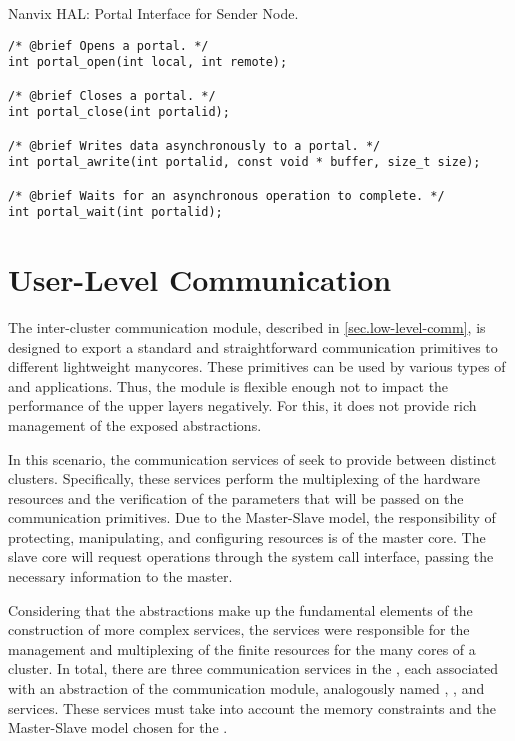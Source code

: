 \begin{listing}[!tb]
\caption{Nanvix HAL: Portal Interface for Sender Node.}
\label{code:hal-portal-sender}
\begin{verbatim}
/* @brief Opens a portal. */
int portal_open(int local, int remote);

/* @brief Closes a portal. */
int portal_close(int portalid);

/* @brief Writes data asynchronously to a portal. */
int portal_awrite(int portalid, const void * buffer, size_t size);

/* @brief Waits for an asynchronous operation to complete. */
int portal_wait(int portalid);
\end{verbatim}
\end{listing}


	\section{User-Level Communication}
	\label{sec.comm-services}

		The inter-cluster communication module, described in \autoref{sec.low-level-comm},
		is designed to export a standard and straightforward communication
		primitives to different lightweight manycores.
		These primitives can be used by various types of \oss and applications.
		Thus, the module is flexible enough not to impact the performance
		of the upper layers negatively.
		For this, it does not provide rich management of the exposed abstractions.

		In this scenario, the communication services of \nanvix \microkernel seek
		to provide \ipc between distinct clusters.
		Specifically, these services perform the multiplexing of the hardware
		resources and the verification of the parameters that will be passed
		on the communication primitives.
		Due to the Master-Slave model, the responsibility of protecting,
		manipulating, and configuring \hal resources is of the master core.
		The slave core will request operations through the system call interface,
		passing the necessary information to the master.

		Considering that the abstractions make up the fundamental elements of
		the construction of more complex services, the \microkernel services
		were responsible for the management and multiplexing of the finite
		resources for the many cores of a cluster.
		In total, there are three communication services in the \nanvix \microkernel,
		each associated with an abstraction of the communication module,
		analogously named \sync, \mailbox, and \portal services.
		These services must take into account the memory constraints and the
		Master-Slave model chosen for the \microkernel.

